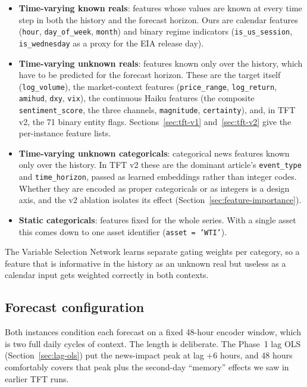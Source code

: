 \begin{itemize}
  \item \textbf{Time-varying known reals}: features whose values are known at every time step in both the history and the forecast horizon. Ours are calendar features (\texttt{hour}, \texttt{day\_of\_week}, \texttt{month}) and binary regime indicators (\texttt{is\_us\_session}, \texttt{is\_wednesday} as a proxy for the EIA release day).
  \item \textbf{Time-varying unknown reals}: features known only over the history, which have to be predicted for the forecast horizon. These are the target itself (\texttt{log\_volume}), the market-context features (\texttt{price\_range}, \texttt{log\_return}, \texttt{amihud}, \texttt{dxy}, \texttt{vix}), the continuous Haiku features (the composite \texttt{sentiment\_score}, the three channels, \texttt{magnitude}, \texttt{certainty}), and, in TFT v2, the 71 binary entity flags. Sections~\ref{sec:tft-v1} and~\ref{sec:tft-v2} give the per-instance feature lists.
  \item \textbf{Time-varying unknown categoricals}: categorical news features known only over the history. In TFT v2 these are the dominant article's \texttt{event\_type} and \texttt{time\_horizon}, passed as learned embeddings rather than integer codes. Whether they are encoded as proper categoricals or as integers is a design axis, and the v2 ablation isolates its effect (Section~\ref{sec:feature-importance}).
  \item \textbf{Static categoricals}: features fixed for the whole series. With a single asset this comes down to one asset identifier (\texttt{asset = 'WTI'}).
\end{itemize}

The Variable Selection Network learns separate gating weights per category, so a feature that is informative in the history as an unknown real but useless as a calendar input gets weighted correctly in both contexts.

\subsection{Forecast configuration}\label{sec:forecast-config}

Both instances condition each forecast on a fixed 48-hour encoder window, which is two full daily cycles of context. The length is deliberate. The Phase~1 lag OLS (Section~\ref{sec:lag-ols}) put the news-impact peak at lag $+6$ hours, and 48 hours comfortably covers that peak plus the second-day ``memory'' effects we saw in earlier TFT runs.

